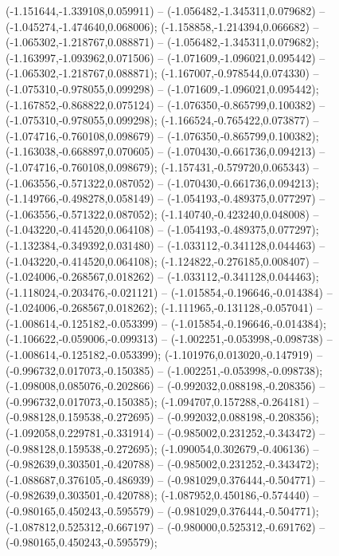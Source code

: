  (-1.151644,-1.339108,0.059911) -- (-1.056482,-1.345311,0.079682) -- (-1.045274,-1.474640,0.068006);
 (-1.158858,-1.214394,0.066682) -- (-1.065302,-1.218767,0.088871) -- (-1.056482,-1.345311,0.079682);
 (-1.163997,-1.093962,0.071506) -- (-1.071609,-1.096021,0.095442) -- (-1.065302,-1.218767,0.088871);
 (-1.167007,-0.978544,0.074330) -- (-1.075310,-0.978055,0.099298) -- (-1.071609,-1.096021,0.095442);
 (-1.167852,-0.868822,0.075124) -- (-1.076350,-0.865799,0.100382) -- (-1.075310,-0.978055,0.099298);
 (-1.166524,-0.765422,0.073877) -- (-1.074716,-0.760108,0.098679) -- (-1.076350,-0.865799,0.100382);
 (-1.163038,-0.668897,0.070605) -- (-1.070430,-0.661736,0.094213) -- (-1.074716,-0.760108,0.098679);
 (-1.157431,-0.579720,0.065343) -- (-1.063556,-0.571322,0.087052) -- (-1.070430,-0.661736,0.094213);
 (-1.149766,-0.498278,0.058149) -- (-1.054193,-0.489375,0.077297) -- (-1.063556,-0.571322,0.087052);
 (-1.140740,-0.423240,0.048008) -- (-1.043220,-0.414520,0.064108) -- (-1.054193,-0.489375,0.077297);
 (-1.132384,-0.349392,0.031480) -- (-1.033112,-0.341128,0.044463) -- (-1.043220,-0.414520,0.064108);
 (-1.124822,-0.276185,0.008407) -- (-1.024006,-0.268567,0.018262) -- (-1.033112,-0.341128,0.044463);
 (-1.118024,-0.203476,-0.021121) -- (-1.015854,-0.196646,-0.014384) -- (-1.024006,-0.268567,0.018262);
 (-1.111965,-0.131128,-0.057041) -- (-1.008614,-0.125182,-0.053399) -- (-1.015854,-0.196646,-0.014384);
 (-1.106622,-0.059006,-0.099313) -- (-1.002251,-0.053998,-0.098738) -- (-1.008614,-0.125182,-0.053399);
 (-1.101976,0.013020,-0.147919) -- (-0.996732,0.017073,-0.150385) -- (-1.002251,-0.053998,-0.098738);
 (-1.098008,0.085076,-0.202866) -- (-0.992032,0.088198,-0.208356) -- (-0.996732,0.017073,-0.150385);
 (-1.094707,0.157288,-0.264181) -- (-0.988128,0.159538,-0.272695) -- (-0.992032,0.088198,-0.208356);
 (-1.092058,0.229781,-0.331914) -- (-0.985002,0.231252,-0.343472) -- (-0.988128,0.159538,-0.272695);
 (-1.090054,0.302679,-0.406136) -- (-0.982639,0.303501,-0.420788) -- (-0.985002,0.231252,-0.343472);
 (-1.088687,0.376105,-0.486939) -- (-0.981029,0.376444,-0.504771) -- (-0.982639,0.303501,-0.420788);
 (-1.087952,0.450186,-0.574440) -- (-0.980165,0.450243,-0.595579) -- (-0.981029,0.376444,-0.504771);
 (-1.087812,0.525312,-0.667197) -- (-0.980000,0.525312,-0.691762) -- (-0.980165,0.450243,-0.595579);
